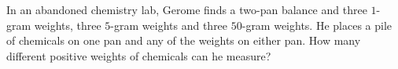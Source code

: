 In an abandoned chemistry lab, Gerome finds a two-pan balance and three $1$-gram weights, three $5$-gram weights and three $50$-gram weights. He places a pile of chemicals on one pan and any of the weights on either pan. How many different positive weights of chemicals can he measure?
